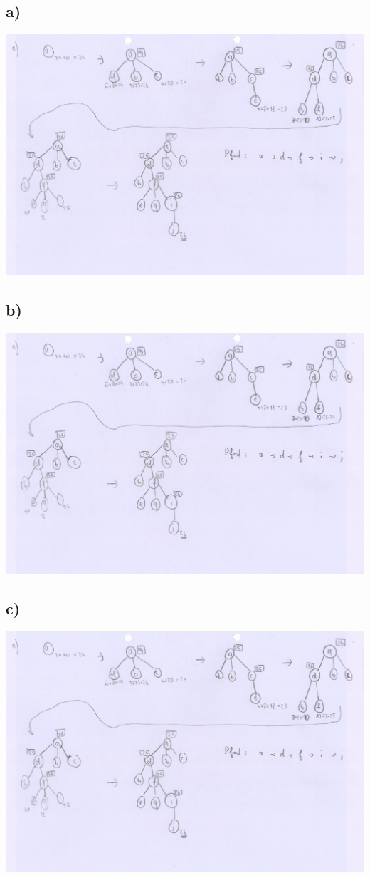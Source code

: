 \documentclass[12pt,a4paper]{scrartcl}
\begin{document}
	
\section{}
	\subsection*{a)}
		\includegraphics[width=\textwidth]{Aufgabe1a.png}
	\subsection*{b)}
		\includegraphics[width=\textwidth]{Aufgabe1a.png}
	\subsection*{c)}
		\includegraphics[width=\textwidth]{Aufgabe1a.png}
\end{document}
